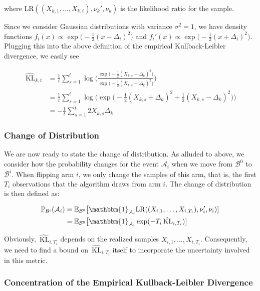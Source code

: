 \documentclass[11pt,]{article}
\newcommand{\KL}{\,\text{KL}}
\begin{document}
where \(\text{LR}((X_{k,1}, \dots,X_{k,t}), \nu_k', \nu_k)\) is the
likelihood ratio for the sample.

Since we consider Gaussian distributions with variance \(\sigma^2 = 1\),
we have density functions
\(f_i(x) \propto \exp \big(-\frac{1}{2} (x-\Delta_i)^2\big)\) and
\(f_i'(x) \propto \exp \big(-\frac{1}{2} (x+\Delta_i)^2\big)\). Plugging
this into the above definition of the empirical Kullback-Leibler
divergence, we easily see

\begin{align*}
\hat{\KL}_{k,t} & = \frac{1}{t} \sum_{s=1}^{t} \log \Big(\frac{\exp \big(-\frac{1}{2} (X_{k,s}+\Delta_k)^2\big)}{\exp \big(-\frac{1}{2} (X_{k,s}-\Delta_k)^2\big)} \Big) \\
& = \frac{1}{t} \sum_{s=1}^{t} \log \Big( \exp \big(-\frac{1}{2} (X_{k,s}+\Delta_k)^2 + \frac{1}{2} (X_{k,s}-\Delta_k)^2 \big) \Big) \\
& = - \frac{1}{t} \sum_{s=1}^{t} 2 X_{k,s} \Delta_k
\end{align*}

\subsubsection{Change of Distribution}\label{change-of-distribution}

We are now ready to state the change of distribution. As alluded to
above, we consider how the probability changes for the event
\(\mathcal{A}_i\) when we move from \(\mathcal{B}^0\) to
\(\mathcal{B}^i\). When flipping arm \(i\), we only change the samples
of this arm, that is, the first \(T_i\) observations that the algorithm
draws from arm \(i\). The change of distribution is then defined as:

\begin{align*}
\mathbb{P}_{\mathcal{B}^i}(\mathcal{A}_i) & = \mathbb{E}_{\mathcal{B}^0} \big[\mathbbm{1}_{\mathcal{A}_i} \text{LR}((X_{i,1}, \dots,X_{i,T_i}), \nu_i', \nu_i) ] \\
& = \mathbb{E}_{\mathcal{B}^0} \big[\mathbbm{1}_{\mathcal{A}_i} \exp (- T_i \hat{\KL}_{i,T_i}) ]
\end{align*}

Obviously, \(\hat{\KL}_{i,T_i}\) depends on the realized samples
\(X_{i,1}, \dots,X_{i,T_i}\). Consequently, we need to find a bound on
\(\hat{\KL}_{i,T_i}\) itself to incorporate the uncertainty involved in
this metric.

\subsubsection{Concentration of the Empirical Kullback-Leibler
Divergence}\label{concentration-of-the-empirical-kullback-leibler-divergence}
\end{document}
